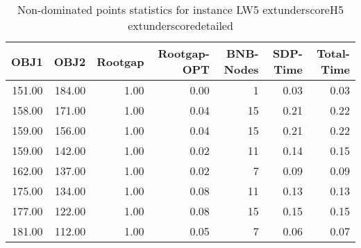 \begin{table}
\caption{Non-dominated points statistics for instance LW5	extunderscoreH5	extunderscoredetailed}
\label{tab:plots/LW5_H5_detailed}
\begin{tabular}{rrrrrrr}
\toprule
OBJ1 & OBJ2 & Rootgap & Rootgap-OPT & BNB-Nodes & SDP-Time & Total-Time \\
\midrule
151.00 & 184.00 & 1.00 & 0.00 & 1 & 0.03 & 0.03 \\
158.00 & 171.00 & 1.00 & 0.04 & 15 & 0.21 & 0.22 \\
159.00 & 156.00 & 1.00 & 0.04 & 15 & 0.21 & 0.22 \\
159.00 & 142.00 & 1.00 & 0.02 & 11 & 0.14 & 0.15 \\
162.00 & 137.00 & 1.00 & 0.02 & 7 & 0.09 & 0.09 \\
175.00 & 134.00 & 1.00 & 0.08 & 11 & 0.13 & 0.13 \\
177.00 & 122.00 & 1.00 & 0.08 & 15 & 0.15 & 0.15 \\
181.00 & 112.00 & 1.00 & 0.05 & 7 & 0.06 & 0.07 \\
\bottomrule
\end{tabular}
\end{table}
